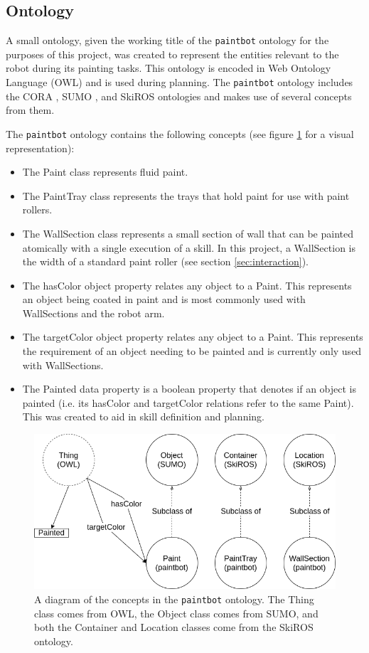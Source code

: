 \subsection{Ontology} \label{sec:ontology}
A small ontology, given the working title of the {\tt paintbot} ontology for the purposes of this project, was created to represent the entities relevant to the robot during its painting tasks. This ontology is encoded in Web Ontology Language (OWL) and is used during planning. The {\tt paintbot} ontology includes the CORA \cite{ieee2015cora}, SUMO \cite{sumo}, and SkiROS ontologies and makes use of several concepts from them.

The {\tt paintbot} ontology contains the following concepts (see figure \ref{fig:paintbot_ontology} for a visual representation):
\begin{itemize}
    \item The Paint class represents fluid paint.
    \item The PaintTray class represents the trays that hold paint for use with paint rollers.
    \item The WallSection class represents a small section of wall that can be painted atomically with a single execution of a skill. In this project, a WallSection is the width of a standard paint roller (see section \ref{sec:interaction}).
    \item The hasColor object property relates any object to a Paint. This represents an object being coated in paint and is most commonly used with WallSections and the robot arm.
    \item The targetColor object property relates any object to a Paint. This represents the requirement of an object needing to be painted and is currently only used with WallSections.
    \item The Painted data property is a boolean property that denotes if an object is painted (i.e. its hasColor and targetColor relations refer to the same Paint). This was created to aid in skill definition and planning.
\end{itemize}

\begin{figure}
    \centering
    \includegraphics[width=0.75\linewidth]{images/ontology.png}
    \caption{A diagram of the concepts in the {\tt paintbot} ontology. The Thing class comes from OWL, the Object class comes from SUMO, and both the Container and Location classes come from the SkiROS ontology.}
    \label{fig:paintbot_ontology}
\end{figure}

